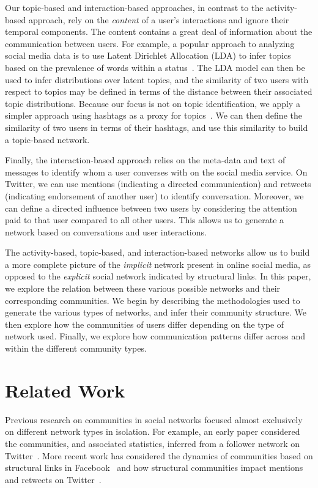  


Our topic-based and interaction-based approaches, in contrast to the activity-based approach, rely on the \emph{content} of a user's interactions and ignore their temporal components. The content contains a great deal of information about the communication between users. For example, a popular approach to analyzing social media data is to use Latent Dirichlet Allocation (LDA) to infer topics based on the prevalence of words within a status~\cite{zhao2011comparing,michelson2010discovering}. The LDA model can then be used to infer distributions over latent topics, and the similarity of two users with respect to topics may be defined in terms of the distance between their associated topic distributions. Because our focus is not on topic identification, we apply a simpler approach using hashtags as a proxy for topics~\cite{becker2011beyond,tsur2012s}. We can then define the similarity of two users in terms of their hashtags, and use this similarity to build a topic-based network.

Finally, the interaction-based approach relies on the meta-data and text of messages to identify whom a user converses with on the social media service. On Twitter, we can use mentions (indicating a directed communication) and retweets (indicating endorsement of another user) to identify conversation. Moreover, we can define a directed influence between two users by considering the attention paid to that user compared to all other users. This allows us to generate a network based on conversations and user interactions.

The activity-based, topic-based, and interaction-based networks allow us to build a more complete picture of the \emph{implicit} network present in online social media, as opposed to the \emph{explicit} social network indicated by structural links. In this paper, we explore the relation between these various possible networks and their corresponding communities. We begin by describing the methodologies used to generate the various types of networks, and infer their community structure. We then explore how the communities of users differ depending on the type of network used. Finally, we explore how communication patterns differ across and within the different community types.

\section{Related Work}

Previous research on communities in social networks focused almost exclusively on different network types in isolation. For example, an early paper considered the communities, and associated statistics, inferred from a follower network on Twitter~\cite{java2009we}. More recent work has considered the dynamics of communities based on structural links in Facebook~\cite{nguyen2011adaptive} and how structural communities impact mentions and retweets on Twitter~\cite{grabowicz2012social}.




